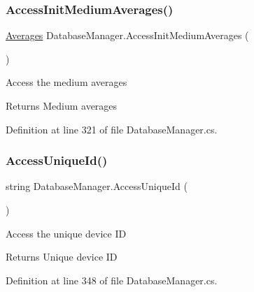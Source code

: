 \mbox{\label{class_database_manager_a7e11fd2b33cec339e52eb3df7b595da1}} 
\subsubsection{\texorpdfstring{Access\+Init\+Medium\+Averages()}{AccessInitMediumAverages()}}
{\footnotesize\ttfamily \mbox{\hyperlink{struct_level_generation_1_1_averages}{Averages}} Database\+Manager.\+Access\+Init\+Medium\+Averages (\begin{DoxyParamCaption}{ }\end{DoxyParamCaption})}



Access the medium averages 

\begin{DoxyReturn}{Returns}
Medium averages
\end{DoxyReturn}


Definition at line 321 of file Database\+Manager.\+cs.

\mbox{\label{class_database_manager_a78fbe5d16d91f8a9da73c348518af5fb}} 
\subsubsection{\texorpdfstring{Access\+Unique\+Id()}{AccessUniqueId()}}
{\footnotesize\ttfamily string Database\+Manager.\+Access\+Unique\+Id (\begin{DoxyParamCaption}{ }\end{DoxyParamCaption})}



Access the unique device ID 

\begin{DoxyReturn}{Returns}
Unique device ID
\end{DoxyReturn}


Definition at line 348 of file Database\+Manager.\+cs.

\mbox{\label{class_database_manager_ab6b2a5348b157b217b1ee38a468a3167}} 

